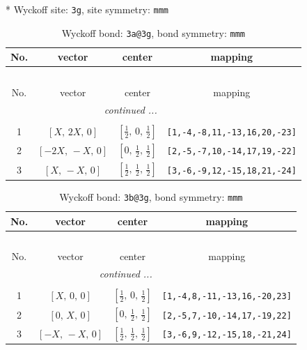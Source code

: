\documentclass[fleqn,8pt]{jsarticle}
\begin{document}
* Wyckoff site: {\tt 3g}, site symmetry: {\tt mmm}
\renewcommand{\arraystretch}{1.2}
\begin{longtable}{cccc}
\caption{Wyckoff bond: {\tt 3a@3g}, bond symmetry: {\tt mmm}}
 \\
 \hline \hline
No. & vector & center & mapping \\ \hline \endfirsthead

\multicolumn{3}{l}{\tablename\ \thetable{}} \\
 \hline \hline
No. & vector & center & mapping \\ \hline \endhead

 \hline \hline
\multicolumn{3}{r}{\footnotesize\it continued ...} \\ \endfoot

 \hline \hline
\multicolumn{3}{r}{} \\ \endlastfoot

1 & $\left[ X,\, 2 X,\, 0 \right]$ & $\left[ \frac{1}{2},\, 0,\, \frac{1}{2} \right]$ & {\tt [1,-4,-8,11,-13,16,20,-23]} \\ \hline
2 & $\left[ - 2 X,\, - X,\, 0 \right]$ & $\left[ 0,\, \frac{1}{2},\, \frac{1}{2} \right]$ & {\tt [2,-5,-7,10,-14,17,19,-22]} \\ \hline
3 & $\left[ X,\, - X,\, 0 \right]$ & $\left[ \frac{1}{2},\, \frac{1}{2},\, \frac{1}{2} \right]$ & {\tt [3,-6,-9,12,-15,18,21,-24]} \\
\end{longtable}
\renewcommand{\arraystretch}{1.2}
\begin{longtable}{cccc}
\caption{Wyckoff bond: {\tt 3b@3g}, bond symmetry: {\tt mmm}}
 \\
 \hline \hline
No. & vector & center & mapping \\ \hline \endfirsthead

\multicolumn{3}{l}{\tablename\ \thetable{}} \\
 \hline \hline
No. & vector & center & mapping \\ \hline \endhead

 \hline \hline
\multicolumn{3}{r}{\footnotesize\it continued ...} \\ \endfoot

 \hline \hline
\multicolumn{3}{r}{} \\ \endlastfoot

1 & $\left[ X,\, 0,\, 0 \right]$ & $\left[ \frac{1}{2},\, 0,\, \frac{1}{2} \right]$ & {\tt [1,-4,8,-11,-13,16,-20,23]} \\ \hline
2 & $\left[ 0,\, X,\, 0 \right]$ & $\left[ 0,\, \frac{1}{2},\, \frac{1}{2} \right]$ & {\tt [2,-5,7,-10,-14,17,-19,22]} \\ \hline
3 & $\left[ - X,\, - X,\, 0 \right]$ & $\left[ \frac{1}{2},\, \frac{1}{2},\, \frac{1}{2} \right]$ & {\tt [3,-6,9,-12,-15,18,-21,24]} \\
\end{longtable}
\end{document}
